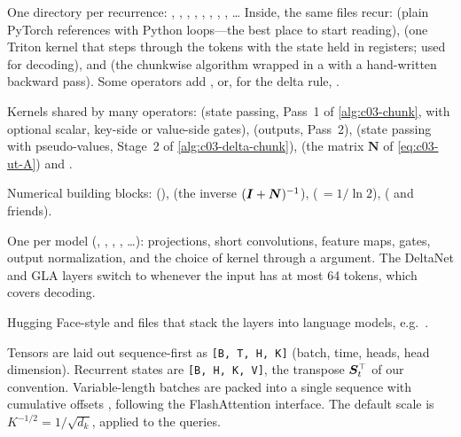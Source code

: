 \begin{sloppypar}
\begin{description}[style=nextline,leftmargin=1.2em]
\item[\texttt{fla/ops/<op>/}] One directory per recurrence: , ,
, , , , ,
, \dots{} Inside, the same files recur:
 (plain PyTorch references with Python loops---the best place to start reading),
 (one Triton kernel that steps through the tokens with the state held in
registers; used for decoding), and  (the chunkwise algorithm wrapped in a
 with a hand-written backward pass). Some operators add
,  or, for the delta rule, .
\item[\texttt{fla/ops/common/}] Kernels shared by many operators:  (state
passing, Pass~1 of \cref{alg:c03-chunk}, with optional scalar, key-side or value-side gates),
 (outputs, Pass~2),  (state passing with pseudo-values,
Stage~2 of \cref{alg:c03-delta-chunk}),  (the matrix $\bm{N}$ of
\cref{eq:c03-ut-A}) and .
\item[\texttt{fla/ops/utils/}] Numerical building blocks: 
(),  (the inverse $(\bm{I}+\bm{N})^{-1}$),
 ($\,=1/\ln2$),  ( and friends).
\item[\texttt{fla/layers/}] One  per model (, ,
, , \dots): projections, short convolutions, feature maps,
gates, output normalization, and the choice of kernel through a  argument. The
DeltaNet and GLA layers switch to  whenever the input has at most 64
tokens, which covers decoding.
\item[\texttt{fla/models/<model>/}] Hugging Face-style  and
 files that stack the layers into language models, e.g.\
.
\end{description}

Tensors are laid out sequence-first as \texttt{[B, T, H, K]} (batch, time, heads, head
dimension). Recurrent states are \texttt{[B, H, K, V]}, the transpose $\bm{S}_t^{\top}$ of our
convention. Variable-length batches are packed into a single sequence with cumulative offsets
\code{cu_seqlens}, following the FlashAttention interface. The default scale is
$K^{-1/2}=1/\sqrt{d_k}$, applied to the queries.


\end{sloppypar}
